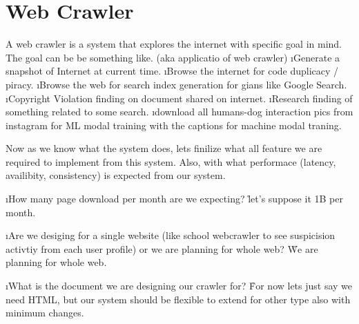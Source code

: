 
\chapter{Web Crawler}

    A web crawler is a system that explores the internet with specific goal in mind. The goal can be be something like. (aka applicatio of web crawler)
    \ls
        \i Generate a snapshot of Internet at current time.
        \i Browse the internet for code duplicacy / piracy.
        \i Browse the web for search index generation for gians like Google Search.
        \i  Copyright Violation finding on document shared on internet.
        \i Research finding of something related to some search.
        \i download  all humans-dog interaction pics from instagram for ML modal training with the captions for machine modal traning.
    \le
\qe



Now as we know what the system does, lets finilize what all feature we are required to implement from this system. Also, with what performace (latency, availibity, consistency) is expected from our system.

\lstart
    \i How many page download per month are we expecting? 
    \r{let's suppose it 1B per month.}
    
    \i Are we desiging for a single website (like school webcrawler to see suspicision activtiy from each user profile) or we are planning for whole web?
    \r{We are planning for whole web.}

    \i What is the document we are designing our crawler for?
    \r{For now lets just say we need HTML, but our system should be flexible to extend for other type also with minimum changes.}


\lend